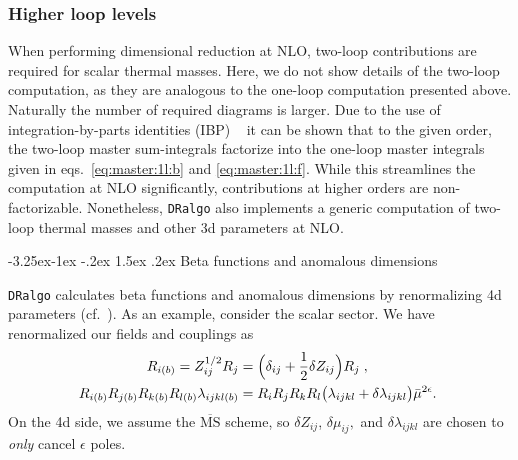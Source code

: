 \documentclass[11pt]{article}
\makeatletter
\def\dralgo{{\tt DRalgo}}
\newcommand{\bmu}{\bar\mu}
\newcommand{\eps}{\epsilon}
\renewcommand\subsection{\@startsection{subsection}{2}{\z@}%
  {-3.25ex\@plus -1ex \@minus -.2ex}%
  {1.5ex \@plus .2ex}%
  {\normalfont\normalsize\bfseries}}
\makeatother
\begin{document}
\subsubsection*{Higher loop levels}

When performing dimensional reduction at NLO,
two-loop contributions are required for scalar thermal masses.
Here, we do not show details of
the two-loop computation, as they are analogous to
the one-loop computation presented above.
Naturally the number of required diagrams is larger.
Due to the use of
integration-by-parts identities (IBP) ~\cite{%
  Chetyrkin:1981qh,Tkachov:1981wb,Nishimura:2012ee}
it can be shown that to the given order,
the two-loop master sum-integrals factorize into
the one-loop master integrals given in
eqs.~\eqref{eq:master:1l:b} and \eqref{eq:master:1l:f}.
While this streamlines the computation at NLO significantly,
contributions at higher orders are non-factorizable.
Nonetheless, \dralgo{} also implements
a generic computation of two-loop thermal masses and other 3d parameters
at NLO.

%
\subsection{Beta functions and anomalous dimensions}
\label{sec:BetaFunc}

\dralgo{} calculates beta functions and anomalous dimensions by renormalizing 4d parameters (cf.~\cite{Machacek:1983tz,Machacek:1983fi,Machacek:1984zw}). 
As an example, consider the scalar sector.
We have renormalized our fields and couplings as
\begin{align}
  R_{i(b)}=Z^{1/2}_{ij} R_{j} &= \Bigl(\delta_{ij}+\frac{1}{2}\delta Z_{ij}\Bigr)R_j
  \;, \\
  R_{i(b)} R_{j(b)} R_{k(b)} R_{l(b)}\lambda_{ijkl(b)} &=
  R_i R_j R_k R_l\bigl(\lambda_{ijkl}+\delta\lambda_{ijkl}\bigr)\bmu^{2\eps}.
  \;
\end{align}
On the 4d side,
we assume the $\overline{\text{MS}}$ scheme, so
$\delta Z_{ij}$,
$\delta\mu_{ij},$ and
$\delta\lambda_{ijkl}$ are chosen to {\em only} cancel
$\epsilon$ poles.
\end{document}
